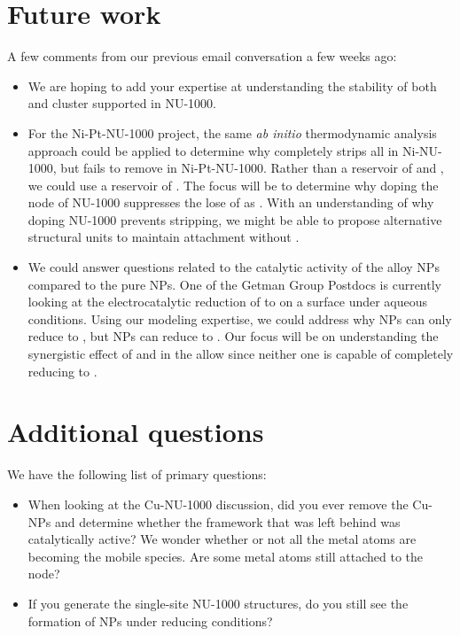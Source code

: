 \documentclass[12pt]{article}
\begin{document}
\section{Future work}
A few comments from our previous email conversation a few weeks ago:
\begin{itemize}
    \item We are hoping to add your expertise at understanding the stability of both  and  cluster supported in NU-1000.
    \item For the Ni-Pt-NU-1000 project, the same \textit{ab initio} thermodynamic analysis approach could be applied to determine why  completely strips all  in Ni-NU-1000, but fails to remove  in Ni-Pt-NU-1000. Rather than a reservoir of  and , we could use a reservoir of . The focus will be to determine why  doping the node of NU-1000 suppresses the lose of  as . With an understanding of why  doping NU-1000 prevents  stripping, we might be able to propose alternative structural units to maintain  attachment without . 
    \item We could answer questions related to the catalytic activity of the  alloy NPs compared to the pure  NPs. One of the Getman Group Postdocs is currently looking at the electrocatalytic reduction of  to  on a  surface under aqueous conditions. Using our modeling expertise, we could address why  NPs can only reduce  to , but  NPs can reduce  to . Our focus will be on understanding the synergistic effect of  and  in the  allow since neither one is capable of completely reducing  to . 
\end{itemize}

\section{Additional questions}
We have the following list of primary questions:
\begin{itemize}
    \item When looking at the Cu-NU-1000 discussion, did you ever remove the Cu-NPs and determine whether the framework that was left behind was catalytically active? We wonder whether or not all the metal atoms are becoming the mobile  species. Are some metal atoms still attached to the node? 
    \item If you generate the  single-site NU-1000 structures, do you still see the formation of  NPs under reducing conditions?  
\end{itemize}  
\end{document}
